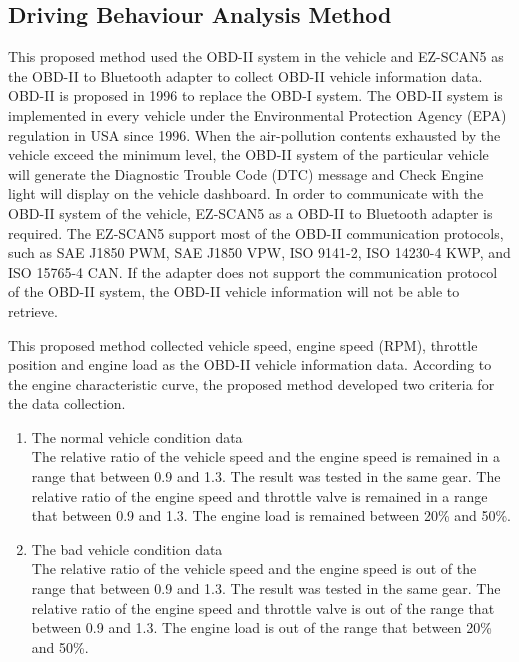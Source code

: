 \subsection{Driving Behaviour Analysis Method}
This proposed method used the OBD-II system in the vehicle and EZ-SCAN5 as the OBD-II to Bluetooth adapter to collect OBD-II vehicle information data. OBD-II is proposed in 1996 to replace the OBD-I system. The OBD-II system is implemented in every vehicle under the Environmental Protection Agency (EPA) regulation in USA since 1996. When the air-pollution contents exhausted by the vehicle exceed the minimum level, the OBD-II system of the particular vehicle will generate the Diagnostic Trouble Code (DTC) message and Check Engine light will display on the vehicle dashboard. In order to communicate with the OBD-II system of the vehicle, EZ-SCAN5 as a OBD-II to Bluetooth adapter is required. The EZ-SCAN5 support most of the OBD-II communication protocols, such as SAE J1850 PWM, SAE J1850 VPW, ISO 9141-2, ISO 14230-4 KWP, and ISO 15765-4 CAN. If the adapter does not support the communication protocol of the OBD-II system, the OBD-II vehicle information will not be able to retrieve.

This proposed method collected vehicle speed, engine speed (RPM), throttle position and engine load as the OBD-II vehicle information data. According to the engine characteristic curve, the proposed method developed two criteria for the data collection.

\begin{enumerate}
\item The normal vehicle condition data \\
The relative ratio of the vehicle speed and the engine speed is remained in a range that between 0.9 and 1.3. The result was tested in the same gear. The relative ratio of the engine speed and throttle valve is remained in a range that between 0.9 and 1.3. The engine load is remained between 20\% and 50\%.  
\item The bad vehicle condition data \\
The relative ratio of the vehicle speed and the engine speed is out of the range that between 0.9 and 1.3. The result was tested in the same gear. The relative ratio of the engine speed and throttle valve is out of the range that between 0.9 and 1.3. The engine load is out of the range that between 20\% and 50\%.
\end{enumerate}

